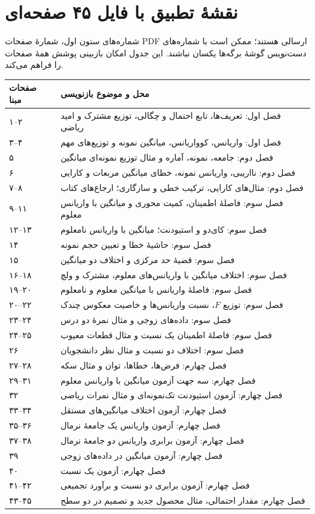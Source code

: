 \section{نقشهٔ تطبیق با فایل ۴۵ صفحه‌ای}
شماره‌های ستون اول، شمارهٔ صفحات PDF ارسالی هستند؛ ممکن است با شماره‌های دست‌نویس گوشهٔ برگه‌ها یکسان نباشند. این جدول امکان بازبینی پوشش همهٔ صفحات را فراهم می‌کند.


\begin{longtable}{l l}
\toprule صفحات مبنا & محل و موضوع بازنویسی\\\midrule

۱–۲ & فصل اول: تعریف‌ها، تابع احتمال و چگالی، توزیع مشترک و امید ریاضی\\
۳–۴ & فصل اول: واریانس، کوواریانس، میانگین نمونه و توزیع‌های مهم\\
۵ & فصل دوم: جامعه، نمونه، آماره و مثال توزیع نمونه‌ای میانگین\\
۶ & فصل دوم: نااریبی، واریانس نمونه، خطای میانگین مربعات و کارایی\\
۷–۸ & فصل دوم: مثال‌های کارایی، ترکیب خطی و سازگاری؛ ارجاع‌های کتاب\\
۹–۱۱ & فصل سوم: فاصلهٔ اطمینان، کمیت محوری و میانگین با واریانس معلوم\\
۱۲–۱۳ & فصل سوم: کای‌دو و استیودنت؛ میانگین با واریانس نامعلوم\\
۱۴ & فصل سوم: حاشیهٔ خطا و تعیین حجم نمونه\\
۱۵ & فصل سوم: قضیهٔ حد مرکزی و اختلاف دو میانگین\\
۱۶–۱۸ & فصل سوم: اختلاف میانگین با واریانس‌های معلوم، مشترک و ولچ\\
۱۹–۲۰ & فصل سوم: فاصلهٔ واریانس با میانگین معلوم و نامعلوم\\
۲۰–۲۲ & فصل سوم: توزیع $F$، نسبت واریانس‌ها و خاصیت معکوس چندک\\
۲۳–۲۴ & فصل سوم: داده‌های زوجی و مثال نمرهٔ دو درس\\
۲۴–۲۵ & فصل سوم: فاصلهٔ اطمینان یک نسبت و مثال قطعات معیوب\\
۲۶ & فصل سوم: اختلاف دو نسبت و مثال نظر دانشجویان\\
۲۷–۲۸ & فصل چهارم: فرض‌ها، خطاها، توان و مثال سکه\\
۲۹–۳۱ & فصل چهارم: سه جهت آزمون میانگین با واریانس معلوم\\
۳۲ & فصل چهارم: آزمون استیودنت تک‌نمونه‌ای و مثال نمرات ریاضی\\
۳۳–۳۴ & فصل چهارم: آزمون اختلاف میانگین‌های مستقل\\
۳۵–۳۶ & فصل چهارم: آزمون واریانس یک جامعهٔ نرمال\\
۳۷–۳۸ & فصل چهارم: آزمون برابری واریانس دو جامعهٔ نرمال\\
۳۹ & فصل چهارم: آزمون میانگین در داده‌های زوجی\\
۴۰ & فصل چهارم: آزمون یک نسبت\\
۴۱–۴۲ & فصل چهارم: آزمون برابری دو نسبت و برآورد تجمیعی\\
۴۳–۴۵ & فصل چهارم: مقدار احتمالی، مثال محصول جدید و تصمیم در دو سطح\\
\bottomrule
\end{longtable}


